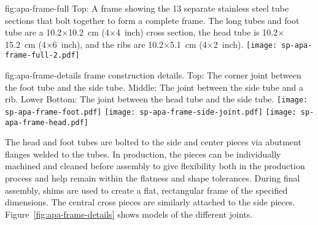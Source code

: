 
\begin{dunefigure}{fig:apa-frame-full}
{Top: A   frame showing the \num{13} separate stainless steel tube sections that bolt together to form a complete frame.  The long tubes and foot tube are a \num{10.2}$\times$\SI{10.2}{cm} (\num{4}$\times$\SI{4}{inch}) cross section, the head tube is \num{10.2}$\times$\SI{15.2}{cm} (\num{4}$\times$\SI{6}{inch}), and the ribs are \num{10.2}$\times$\SI{5.1}{cm} (\num{4}$\times$\SI{2}{inch}). %
}
\texttt{[image: sp-apa-frame-full-2.pdf]}
\end{dunefigure}

\begin{dunefigure}{fig:apa-frame-details}
{ frame construction details. Top: The corner joint between the foot tube and the side tube. Middle: The joint between the side tube and a rib. Lower Bottom: The joint between the head tube and the side tube.}
\texttt{[image: sp-apa-frame-foot.pdf]}
\texttt{[image: sp-apa-frame-side-joint.pdf]}
\texttt{[image: sp-apa-frame-head.pdf]}
\end{dunefigure}

The head and foot tubes are bolted to the side and center pieces via abutment flanges welded to the tubes. In production, the pieces can be individually machined and cleaned before assembly to give flexibility both in the production process and help remain within the flatness and shape tolerances.  During final assembly, shims are used to create a flat, rectangular frame of the specified dimensions.  The central cross pieces are similarly attached to the side pieces.  Figure~\ref{fig:apa-frame-details} shows models of the different joints.   

